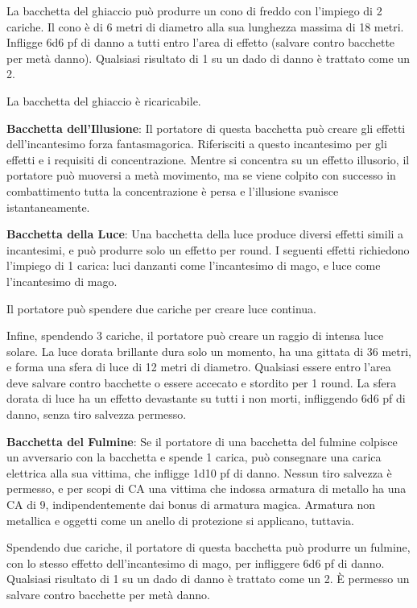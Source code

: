 \documentclass{article}
\begin{document}
\begin{multicols}{2}
La bacchetta del ghiaccio può produrre un cono di freddo con l'impiego di 2 cariche. Il cono è di 6 metri di diametro alla sua lunghezza massima di 18 metri. Infligge 6d6 pf di danno a tutti entro l'area di effetto (salvare contro bacchette per metà danno). Qualsiasi risultato di 1 su un dado di danno è trattato come un 2.

La bacchetta del ghiaccio è ricaricabile.

\textbf{Bacchetta dell'Illusione}: Il portatore di questa bacchetta può creare gli effetti dell'incantesimo forza fantasmagorica. Riferisciti a questo incantesimo per gli effetti e i requisiti di concentrazione. Mentre si concentra su un effetto illusorio, il portatore può muoversi a metà movimento, ma se viene colpito con successo in combattimento tutta la concentrazione è persa e l'illusione svanisce istantaneamente.

\textbf{Bacchetta della Luce}: Una bacchetta della luce produce diversi effetti simili a incantesimi, e può produrre solo un effetto per round. I seguenti effetti richiedono l'impiego di 1 carica: luci danzanti come l'incantesimo di mago, e luce come l'incantesimo di mago.

Il portatore può spendere due cariche per creare luce continua.

Infine, spendendo 3 cariche, il portatore può creare un raggio di intensa luce solare. La luce dorata brillante dura solo un momento, ha una gittata di 36 metri, e forma una sfera di luce di 12 metri di diametro. Qualsiasi essere entro l'area deve salvare contro bacchette o essere accecato e stordito per 1 round. La sfera dorata di luce ha un effetto devastante su tutti i non morti, infliggendo 6d6 pf di danno, senza tiro salvezza permesso.

\textbf{Bacchetta del Fulmine}: Se il portatore di una bacchetta del fulmine colpisce un avversario con la bacchetta e spende 1 carica, può consegnare una carica elettrica alla sua vittima, che infligge 1d10 pf di danno. Nessun tiro salvezza è permesso, e per scopi di CA una vittima che indossa armatura di metallo ha una CA di 9, indipendentemente dai bonus di armatura magica. Armatura non metallica e oggetti come un anello di protezione si applicano, tuttavia.

Spendendo due cariche, il portatore di questa bacchetta può produrre un fulmine, con lo stesso effetto dell'incantesimo di mago, per infliggere 6d6 pf di danno. Qualsiasi risultato di 1 su un dado di danno è trattato come un 2. È permesso un salvare contro bacchette per metà danno.


\end{multicols}
\end{document}
